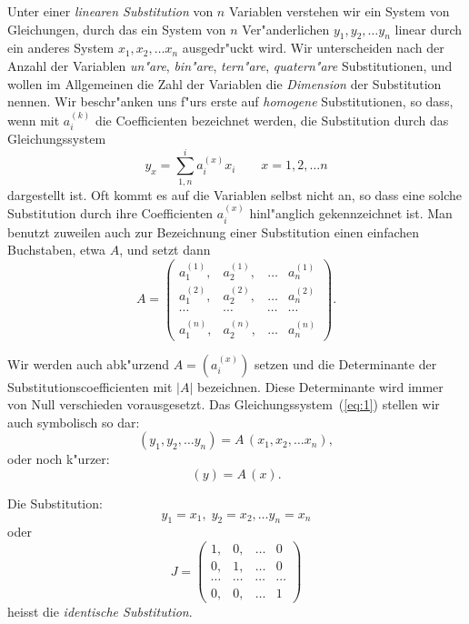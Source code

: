 \documentclass[12pt,a4paper]{article}
\theoremstyle{weber}
\begin{document}
Unter einer \textit{linearen Substitution} von $n$ Variablen verstehen wir ein System von Gleichungen, durch das ein System von $n$ Ver"anderlichen $y_1, y_2, \ldots y_n$ linear durch ein anderes System $x_1, x_2, \ldots x_n$ ausgedr"uckt wird. Wir unterscheiden nach der Anzahl der Variablen \textit{un"are}, \textit{bin"are}, \textit{tern"are}, \textit{quatern"are} Substitutionen, und wollen im Allgemeinen die Zahl der Variablen die \textit{Dimension} der Substitution nennen. Wir beschr"anken uns f"urs erste auf \textit{homogene} Substitutionen, so dass, wenn mit $a_i^{(k)}$ die Coefficienten bezeichnet werden, die Substitution durch das Gleichungssystem
\begin{equation}\label{eq:1}
y_x = \sum_{1,n}^{i} a_i^{(x)} x_i \qquad x = 1, 2, \ldots n
\end{equation}
dargestellt ist. Oft kommt es auf die Variablen selbst nicht an, so dass eine solche Substitution durch ihre Coefficienten $a_i^{(x)}$ hinl"anglich gekennzeichnet ist. Man benutzt zuweilen auch zur Bezeichnung einer Substitution einen einfachen Buchstaben, etwa $A$, und setzt dann
\begin{equation}\label{eq:2}
A = \begin{pmatrix}
a_1^{(1)}, & a_2^{(1)}, & \ldots & a_n^{(1)} \\
a_1^{(2)}, & a_2^{(2)}, & \ldots & a_n^{(2)} \\
\cdots & \cdots & \cdots & \cdots \\
a_1^{(n)}, & a_2^{(n)}, & \ldots & a_n^{(n)}
\end{pmatrix}.
\end{equation}


Wir werden auch abk"urzend $A = (a_i^{(x)})$ setzen und die Determinante der Substitutionscoefficienten mit $|A|$ bezeichnen. Diese Determinante wird immer von Null verschieden vorausgesetzt. Das Gleichungssystem~(\ref{eq:1}) stellen wir auch symbolisch so dar:
\begin{equation}\label{eq:3}
(y_1, y_2, \ldots y_n) = A\,(x_1, x_2, \ldots x_n),
\end{equation}
oder noch k"urzer:
\begin{equation}\label{eq:4}
(y) = A\,(x).
\end{equation}

Die Substitution:
\begin{equation}\label{eq:5}
y_1 = x_1,\; y_2 = x_2, \ldots y_n = x_n
\end{equation}
oder
\begin{equation}\label{eq:6}
J = \begin{pmatrix}
1, & 0, & \ldots & 0 \\
0, & 1, & \ldots & 0 \\
\cdots & \cdots & \cdots & \cdots \\
0, & 0, & \ldots & 1
\end{pmatrix}
\end{equation}
heisst die \textit{identische Substitution}.
\end{document}
